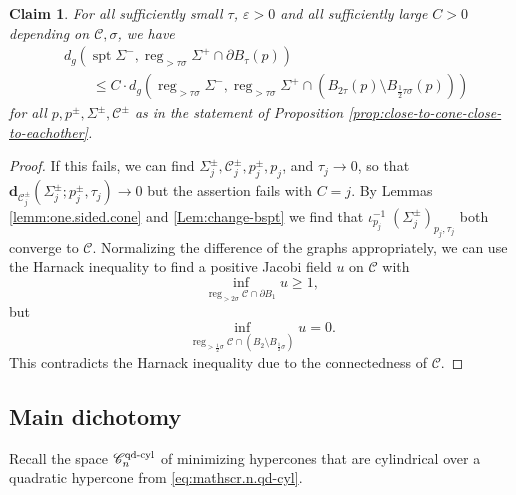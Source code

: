 \documentclass[11pt, letterpaper, reqno]{amsart}
\numberwithin{equation}{section}
\newtheorem{Cla}[Def]{Claim}
\theoremstyle{remark}
\newcommand{\cC}{\mathcal{C}}
\newcommand{\mbfd}{\mathbf{d}}
\newcommand{\supp}{\operatorname{spt}}
\newcommand{\reg}{\operatorname{reg}}
\newcommand{\eps}{\varepsilon}
\begin{document}
\begin{Cla}\label{claim:harnack-to-bdry-sphere}
For all sufficiently small $\tau$, $\eps > 0$ and all sufficiently large $C>0$ depending on $\cC, \sigma$, we have
\begin{align*}
	& d_g(\supp \Sigma^-, \reg_{>\tau\sigma} \Sigma^+ \cap \partial B_{\tau}(p)) \\
	& \qquad \leq C \cdot d_g(\reg_{>\tau \sigma}\Sigma^-, \reg_{>\tau \sigma} \Sigma^+ \cap (B_{2\tau}(p)\setminus B_{\frac12 \tau\sigma}(p)))
\end{align*}
for all $p,p^\pm,\Sigma^\pm,\cC^\pm$ as in the statement of Proposition \ref{prop:close-to-cone-close-to-eachother}.
\end{Cla}
\begin{proof}
    If this fails, we can find $\Sigma^\pm_j,\cC^\pm_j,p^\pm_j,p_j$, and $\tau_j\to 0$, so that $\mbfd_{\cC^\pm_j}(\Sigma^\pm_j;p^\pm_j,\tau_j)\to 0$ but the assertion fails with $C = j$. By Lemmas \ref{lemm:one.sided.cone} and \ref{Lem:change-bspt} we find that $\iota_{p_j}^{-1} \; (\Sigma_j^\pm)_{p_j,\tau_j}$ both converge to $\cC$. Normalizing the difference of the graphs appropriately, we can use the Harnack inequality to find a positive Jacobi field $u$ on $\cC$ with 
    \[
    \inf_{\reg_{>2 \sigma} \cC \cap \partial B_1} u \geq 1,
    \]
    but
    \[
    \inf_{\reg_{>\frac12 \sigma} \cC \cap (B_2\setminus B_{\frac12 \sigma})}u = 0.
    \]
    This contradicts the Harnack inequality due to the connectedness of $\cC$.
\end{proof}








\subsection{Main dichotomy}

Recall the space $\mathscr{C}_n^{\textnormal{qd-cyl}}$ of minimizing hypercones that are cylindrical over a quadratic hypercone from \eqref{eq:mathscr.n.qd-cyl}.
\end{document}
